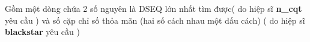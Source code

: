 Gồm một dòng chứa 2 số nguyên là DSEQ lớn nhất tìm được( do hiệp sĩ \textbf{ n\_cqt } yêu cầu ) và số cặp chỉ số thỏa mãn (hai số cách nhau một dấu cách) ( do hiệp sĩ \textbf{ blackstar } yêu cầu )